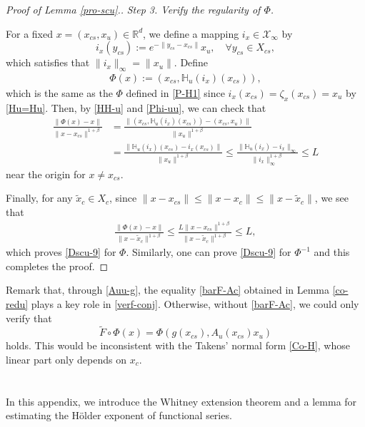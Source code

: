 \documentclass[reqno]{amsart}
\numberwithin{equation}{section}
\begin{document}
\begin{proof}[Proof of Lemma {\rm \ref{pro-scu}}.]
{\em Step 3. Verify the regularity of $\Phi$.}

For a fixed $x=(x_{cs},x_u)\in \mathbb{R}^d$, we define a mapping $i_{x}\in \mathcal{X}_\infty$ by
$$
i_{x}(y_{cs}):=e^{-\|y_{cs}-x_{cs}\|}x_u,\quad \forall y_{cs}\in X_{cs},
$$
which satisfies that $\|i_x\|_\infty=\|x_u\|$.
Define
\begin{align}\label{Phi-uu}
\Phi(x):=(x_{cs},\mathbb{H}_u(i_{x})(x_{cs})),
\end{align}
which is the same as the $\Phi$ defined in \eqref{P-H1} since $i_x(x_{cs})=\zeta_x(x_{cs})=x_u$ by \eqref{Hu=Hu}. Then, by \eqref{HH-u} and \eqref{Phi-uu}, we can check that
\begin{align*}
\frac{\|\Phi(x)-x\|}{\|x-x_{cs}\|^{1+\beta}}
&
= \frac{\|(x_{cs},\mathbb{H}_u(i_{x})(x_{cs}))-(x_{cs},x_u)\|}{\|x_u\|^{1+\beta}}
\\
&= \frac{\|\mathbb{H}_u(i_{x})(x_{cs})-i_x(x_{cs})\|}{\|x_u\|^{1+\beta}}
 \le \frac{\|\mathbb{H}_u(i_{x})-i_{x}\|_\infty}{\|i_{x}\|_\infty^{1+\beta}}\le L
\end{align*}
near the origin for $x\ne x_{cs}$.

Finally, for any  $\tilde{x}_{c}\in X_{c}$, since
$\|x-x_{cs}\|\le \|x-x_c\| \le \|x-\tilde{x}_{c}\|$, we see that
\begin{align*}
\frac{\|\Phi(x)-x\|}{\|x-\tilde{x}_{c}\|^{1+\beta}}
\le   \frac{ L \|x-x_{cs}\|^{1+\beta}}{\|x-\tilde{x}_{c}\|^{1+\beta}}
 \le L,
\end{align*}
which proves \eqref{Dscu-9} for $\Phi$. Similarly, one can prove \eqref{Dscu-9} for $\Phi^{-1}$ and
this completes the proof.
\end{proof}

Remark that,  through \eqref{Auu-g}, the equality \eqref{barF-Ac} obtained in Lemma \ref{co-redu} plays a key role in \eqref{verf-conj}. Otherwise, without \eqref{barF-Ac}, we could only verify that 
$$
\tilde{F}\circ \Phi(x)
=\Phi(g(x_{cs}),A_u(x_{cs})x_u)
$$ 
holds. This would be inconsistent with the Takens’ normal form \eqref{Co-H}, whose linear part only depends on $x_c$.

\appendix
\section{}\label{Appen-A}

In this appendix,   we introduce the Whitney extension theorem   and a lemma for estimating the H\"{o}lder exponent of   functional series.
\end{document}
